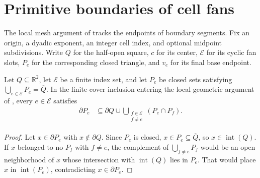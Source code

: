 \section{Primitive boundaries of cell fans}
\label{sec:area_law_fan_frontiers}

The local mesh argument of \cite[Section~11]{OpenAI2026AreaLaw} tracks the
endpoints of boundary segments. Fix an origin, a dyadic exponent, an
integer cell index, and optional midpoint subdivisions. Write $Q$ for the
half-open square, $c$ for its center, $\mathcal E$ for its cyclic fan slots,
$P_e$ for the corresponding closed triangle, and $v_e$ for its final base
endpoint.



\begin{lemma}
    \label{thm:area_law_finite_cover_frontier}
    \leanok
    Let $Q\subseteq\mathbb R^2$, let $\mathcal E$ be a finite index set,
    and let $P_e$ be closed sets satisfying
    $\bigcup_{e\in\mathcal E}P_e=\overline Q$.
    In the finite-cover inclusion entering the local geometric argument
    of \cite[Section~11]{OpenAI2026AreaLaw}, every $e\in\mathcal E$ satisfies
    \begin{align}
        \partial P_e
         & \subseteq\partial Q\cup
        \bigcup_{\substack{f\in\mathcal E \\f\ne e}}(P_e\cap P_f).
    \end{align}
\end{lemma}
\begin{proof}\leanok
    Let $x\in\partial P_e$ with $x\notin\partial Q$.
    Since $P_e$ is closed, $x\in P_e\subseteq\overline Q$, so
    $x\in\operatorname{int}(Q)$.
    If $x$ belonged to no $P_f$ with $f\ne e$, the complement of
    $\bigcup_{f\ne e}P_f$ would be an open neighborhood of $x$ whose
    intersection with $\operatorname{int}(Q)$ lies in $P_e$.
    That would place $x$ in $\operatorname{int}(P_e)$, contradicting
    $x\in\partial P_e$.
\end{proof}

